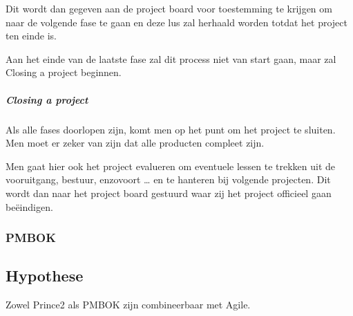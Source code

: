 \documentclass[]{article}
\begin{document}
Dit wordt dan gegeven aan de project board voor toestemming te krijgen om naar de volgende fase te gaan en deze lus zal herhaald worden totdat het project ten einde is. 

Aan het einde van de laatste fase zal dit process niet van start gaan, maar zal Closing a project beginnen.
\subparagraph{Closing a project}
Als alle fases doorlopen zijn, komt men op het punt om het project te sluiten. Men moet er zeker van zijn dat alle producten compleet zijn. 

Men gaat hier ook het project evalueren om eventuele lessen te trekken uit de vooruitgang, bestuur, enzovoort … en te hanteren bij volgende projecten. Dit wordt dan naar het project board gestuurd waar zij het project officieel gaan beëindigen.

\subsubsection{PMBOK}

\subsection{Hypothese}
Zowel Prince2 als PMBOK zijn combineerbaar met Agile.
\end{document}
